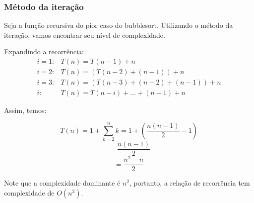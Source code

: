 \subsubsection{Método da iteração}
Seja a função recursiva do pior caso do bubblesort. Utilizando o método da iteração, vamos encontrar seu nível de complexidade. 

Expandindo a recorrência:
\begin{align*}
i = 1 : &T(n) = T(n - 1) + n \\
i = 2 : &T(n) = (T(n - 2) + (n - 1)) + n \\
i = 3 : &T(n) = (T(n - 3) + (n - 2) + (n - 1)) + n \\
i : & T(n) = T(n - i) + \dots + (n - 1) + n
\end{align*}

Assim, temos:

\[
T(n) = 1 + \sum_{k=2}^{n} k = 1 + \left( \frac{n(n-1)}{2} - 1 \right)
\]
\[
= \frac{n(n-1)}{2}
\]
\[
= \frac{n^2 - n}{2}
\]

Note que a complexidade dominante é \( n^2 \), portanto, a relação de recorrência tem complexidade de \( O(n^2) \).
